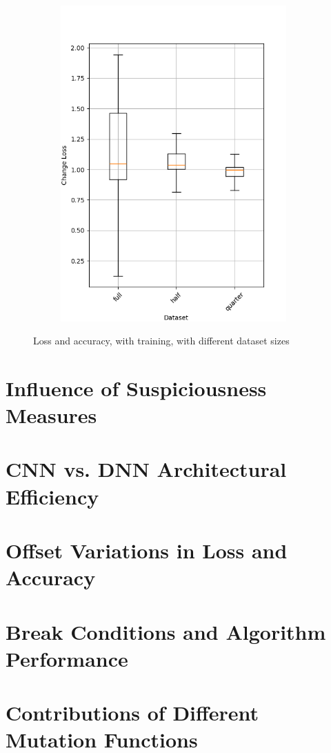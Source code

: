 \begin{figure}
\begin{subfigure}{0.5\textwidth}
        \includegraphics[width=0.95\textwidth]{plots/Dataset_Trained_loss.png}
    \end{subfigure}
    \caption{Loss and accuracy, with training, with different dataset sizes}
    \label{fig:dataset-size-training}
\end{figure}
\section{Influence of Suspiciousness Measures}\label{sec:influence-of-suspiciousness-measures}


\section{CNN vs. DNN Architectural Efficiency}\label{sec:cnn-vs.-dnn-architectural-efficiency}


\section{Offset Variations in Loss and Accuracy}\label{sec:offset-variations-in-loss-and-accuracy}


\section{Break Conditions and Algorithm Performance}\label{sec:break-conditions-and-algorithm-performance}


\section{Contributions of Different Mutation Functions}\label{sec:contributions-of-different-mutation-functions}